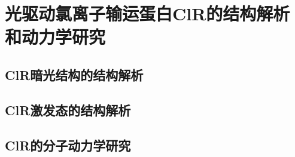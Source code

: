 \chapter{光驱动氯离子输运蛋白ClR的结构解析和动力学研究}

\section{ClR暗光结构的结构解析}

\section{ClR激发态的结构解析}

\section{ClR的分子动力学研究}